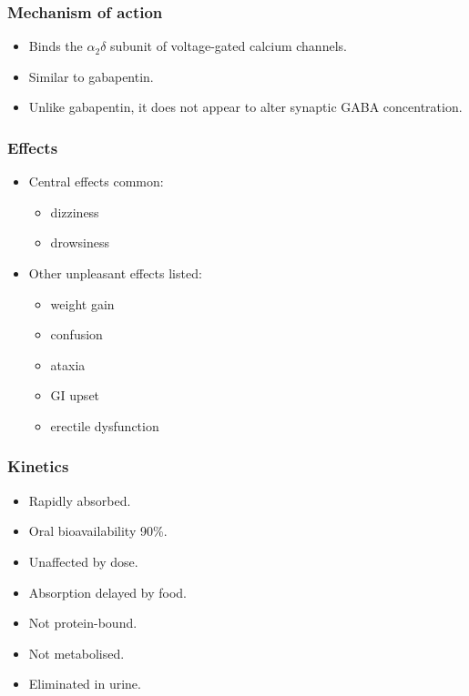 \documentclass[11pt,a4paper]{article}
\begin{document}
\subsubsection{Mechanism of action}
\begin{itemize}
  \item Binds the $\alpha_2\delta$ subunit of voltage-gated calcium channels.
  \item Similar to gabapentin.
  \item Unlike gabapentin, it does not appear to alter synaptic GABA concentration.
\end{itemize}

\subsubsection{Effects}
\begin{itemize}
  \item Central effects common:
  \begin{itemize}
    \item dizziness
    \item drowsiness
  \end{itemize}
  \item Other unpleasant effects listed:
  \begin{itemize}
    \item weight gain
    \item confusion
    \item ataxia
    \item GI upset
    \item erectile dysfunction
  \end{itemize}
\end{itemize}

\subsubsection{Kinetics}
\begin{itemize}
  \item Rapidly absorbed.
  \item Oral bioavailability 90\%.
  \item Unaffected by dose.
  \item Absorption delayed by food.
  \item Not protein-bound.
  \item Not metabolised.
  \item Eliminated in urine.
\end{itemize}
\end{document}
